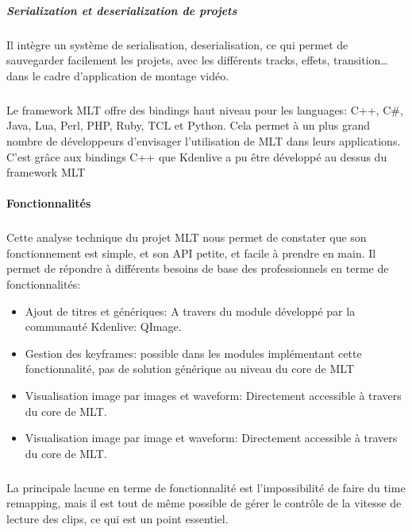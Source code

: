 \subparagraph{Serialization et deserialization de projets}

\subparagraph{}

Il intègre un système de serialisation, deserialisation, ce qui permet
de sauvegarder facilement les projets, avec les différents tracks,
effets, transition\ldots dans le cadre d'application de montage vidéo.

\subparagraph{}

Le framework MLT offre des bindings haut niveau pour les languages:
C++, C\#, Java, Lua, Perl, PHP, Ruby, TCL et Python. Cela permet à
un plus grand nombre de développeurs d'envisager l'utilisation de MLT dans
leurs applications. C'est grâce aux bindings C++ que Kdenlive a pu être
développé au dessus du framework MLT

\paragraph{Fonctionnalités}

\subparagraph{ }

Cette analyse technique du projet MLT nous permet de constater que
son fonctionnement est simple, et son API petite, et facile à prendre
en main.  Il permet de répondre à différents besoins de base  des
professionnels en terme de fonctionnalités:

\begin{itemize}

  \item {Ajout de titres et génériques: A travers du module développé
  par la
    communauté Kdenlive: QImage.}

  \item {Gestion des keyframes: possible dans les modules implémentant
    cette fonctionnalité, pas de solution générique au niveau du
    core de MLT}

  \item {Visualisation image par images et waveform: Directement
  accessible à
    travers du core de MLT.}

  \item {Visualisation image par image et waveform: Directement
  accessible à
    travers du core de MLT.}

\end{itemize}

\subparagraph{}

La principale lacune en terme de fonctionnalité est l'impossibilité de
faire du time remapping, mais il est tout de même possible de gérer le
contrôle de la vitesse de lecture des clips, ce qui est un point essentiel.

